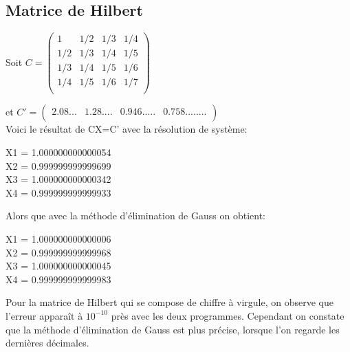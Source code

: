 \documentclass[a4paper,12pt]{report}
\begin{document}
\subsection{Matrice de Hilbert}


\begin{center}
	Soit
	$C=\begin{pmatrix}
	1&1/2&1/3&1/4\\
	1/2&1/3&1/4&1/5\\
	1/3&1/4&1/5&1/6\\
	1/4&1/5&1/6&1/7\\
	\end{pmatrix}$\\   
\end{center}
et
$C'=\begin{pmatrix}
2.08...&1.28....&0.946.....&0.758........\\
\end{pmatrix}$\\

Voici le résultat de CX=C' avec la résolution de système:

\begin{center}
	X1 = 1.000000000000054\\
	X2 = 0.999999999999699\\
	X3 = 1.000000000000342\\
	X4 = 0.999999999999933\\
	
	
	
\end{center}
Alors que avec la méthode d'élimination de Gauss on obtient:
\begin{center}
	X1 = 1.000000000000006\\
	X2 = 0.999999999999968\\
	X3 = 1.000000000000045\\
	X4 = 0.999999999999983\\
	
\end{center}

Pour la matrice de Hilbert qui se compose de chiffre à virgule, on observe que l'erreur apparaît à $10^{-10}$ près avec les deux programmes. Cependant on constate que la méthode d'élimination de Gauss est plus précise, lorsque l'on regarde les dernières décimales.
\\
\newpage
\end{document}
